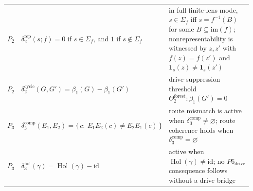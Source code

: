 \documentclass[11pt]{article}
\theoremstyle{definition}
\begin{document}
\begin{longtable}[]{@{}lll@{}}
\begin{minipage}[t]{0.30\columnwidth}\raggedright
\(P_2\)\strut
\end{minipage} & \begin{minipage}[t]{0.30\columnwidth}\raggedright
\(\delta_2^{\mathrm{rep}}(s;f)=0\) if \(s\in\Sigma_f\), and \(1\) if \(s\notin\Sigma_f\)\strut
\end{minipage} & \begin{minipage}[t]{0.30\columnwidth}\raggedright
in full finite-lens mode, \(s\in\Sigma_f\) iff \(s=f^{-1}(B)\) for some \(B\subseteq\mathrm{im}(f)\); nonrepresentability is witnessed by \(z,z'\) with \(f(z)=f(z')\) and \(\mathbf 1_s(z)\neq\mathbf 1_s(z')\)\strut
\end{minipage}\tabularnewline
\begin{minipage}[t]{0.30\columnwidth}\raggedright
\(P_2\)\strut
\end{minipage} & \begin{minipage}[t]{0.30\columnwidth}\raggedright
\(\delta_2^{\mathrm{cycle}}(G,G')=\beta_1(G)-\beta_1(G')\)\strut
\end{minipage} & \begin{minipage}[t]{0.30\columnwidth}\raggedright
drive-suppression threshold \(\Theta_2^{\mathrm{forest}}:\beta_1(G')=0\)\strut
\end{minipage}\tabularnewline
\begin{minipage}[t]{0.30\columnwidth}\raggedright
\(P_3\)\strut
\end{minipage} & \begin{minipage}[t]{0.30\columnwidth}\raggedright
\(\delta_3^{\mathrm{comp}}(E_1,E_2)=\{\,c:\ E_1E_2(c)\neq E_2E_1(c)\,\}\)\strut
\end{minipage} & \begin{minipage}[t]{0.30\columnwidth}\raggedright
route mismatch is active when \(\delta_3^{\mathrm{comp}}\neq\varnothing\); route coherence holds when \(\delta_3^{\mathrm{comp}}=\varnothing\)\strut
\end{minipage}\tabularnewline
\begin{minipage}[t]{0.30\columnwidth}\raggedright
\(P_3\)\strut
\end{minipage} & \begin{minipage}[t]{0.30\columnwidth}\raggedright
\(\delta_3^{\mathrm{hol}}(\gamma)=\operatorname{Hol}(\gamma)-\mathrm{id}\)\strut
\end{minipage} & \begin{minipage}[t]{0.30\columnwidth}\raggedright
active when \(\operatorname{Hol}(\gamma)\neq\mathrm{id}\); no \(P6_{\mathrm{drive}}\) consequence follows without a drive bridge\strut

\end{minipage}
\end{longtable}
\end{document}
